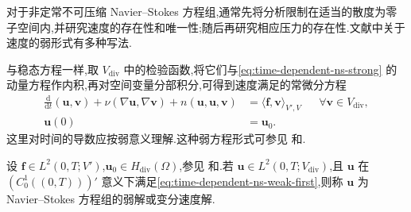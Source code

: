 \begin{note}[关于速度的弱方程]\label{note:time-dependent-ns-weak-velocity}
对于非定常不可压缩 Navier--Stokes 方程组,通常先将分析限制在适当的散度为零子空间内,并研究速度的存在性和唯一性;随后再研究相应压力的存在性.文献中关于速度的弱形式有多种写法.
\end{note}

\begin{note}[速度弱方程的第一种形式]\label{note:time-dependent-ns-weak-form-first}
与稳态方程一样,取 $V_{\mathrm{div}}$ 中的检验函数,将它们与\cref{eq:time-dependent-ns-strong} 的动量方程作内积,再对空间变量分部积分,可得到速度满足的常微分方程
\begin{equation}\label{eq:time-dependent-ns-weak-first}
\begin{aligned}
  \frac{\mathrm{d}}{\mathrm{d}t}(\bm{u},\bm{v})
    +\nu(\nabla\bm{u},\nabla\bm{v})
    +n(\bm{u},\bm{u},\bm{v})
    &=\langle\bm{f},\bm{v}\rangle_{V',V}
      &&\forall\bm{v}\in V_{\mathrm{div}},\\
  \bm{u}(0)&=\bm{u}_0.
\end{aligned}
\end{equation}
这里对时间的导数应按弱意义理解.这种弱方程形式可参见\textcite[第 158 页]{GiraultRaviart1979} 和\textcite[第 280 页]{Temam1984}.
\end{note}

\begin{definition}\label{def:time-dependent-ns-weak-velocity}
设 $\bm{f}\in L^2(0,T;V')$,$\bm{u}_0\in H_{\mathrm{div}}(\Omega)$,参见\textcite[第 158 页]{GiraultRaviart1979} 和\textcite[第 280 页]{Temam1984}.若
$\bm{u}\in L^2(0,T;V_{\mathrm{div}})$,且 $\bm{u}$ 在
$(C_0^1((0,T)))'$ 意义下满足\cref{eq:time-dependent-ns-weak-first},则称 $\bm{u}$ 为 Navier--Stokes 方程组的弱解或变分速度解.
\end{definition}



